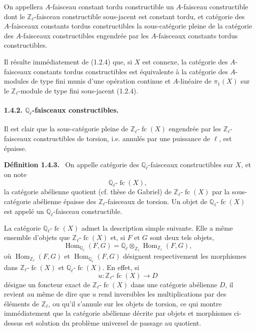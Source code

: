 \documentclass[11pt]{article}
\newenvironment{statement}[1]{\par\medskip\noindent\textbf{#1.}\ }{\par\medskip}
\DeclareMathOperator{\Hom}{Hom}
\providecommand{\Hom}{\operatorname{Hom}}
\providecommand{\fc}{\operatorname{fc}}
\begin{document}
On appellera \(A\)-faisceau constant tordu constructible un \(A\)-faisceau constructible dont le \(\mathbb Z_\ell\)-faisceau constructible sous-jacent est constant tordu, et catégorie des \(A\)-faisceaux constants tordus constructibles la sous-catégorie pleine de la catégorie des \(A\)-faisceaux constructibles engendrée par les \(A\)-faisceaux constants tordus constructibles.

Il résulte immédiatement de (1.2.4) que, si \(X\) est connexe, la catégorie des \(A\)-faisceaux constants tordus constructibles est équivalente à la catégorie des \(A\)-modules de type fini munis d'une opération continue et \(A\)-linéaire de \(\pi_1(X)\) sur le \(\mathbb Z_\ell\)-module de type fini sous-jacent (1.2.4).

\paragraph{1.4.2. \(\mathbb Q_\ell\)-faisceaux constructibles.}
Il est clair que la sous-catégorie pleine de \(\mathbb Z_\ell\text{-}\fc(X)\) engendrée par les \(\mathbb Z_\ell\)-faisceaux constructibles de torsion, i.e. annulés par une puissance de \(\ell\), est épaisse.

\begin{statement}{Définition 1.4.3}
On appelle catégorie des \(\mathbb Q_\ell\)-faisceaux constructibles sur \(X\), et on note
\[
\mathbb Q_\ell\text{-}\fc(X),
\]
la catégorie abélienne quotient (cf. thèse de Gabriel) de \(\mathbb Z_\ell\text{-}\fc(X)\) par la sous-catégorie abélienne épaisse des \(\mathbb Z_\ell\)-faisceaux de torsion. Un objet de \(\mathbb Q_\ell\text{-}\fc(X)\) est appelé un \(\mathbb Q_\ell\)-faisceau constructible.
\end{statement}

La catégorie \(\mathbb Q_\ell\text{-}\fc(X)\) admet la description simple suivante. Elle a même ensemble d'objets que \(\mathbb Z_\ell\text{-}\fc(X)\) et, si \(F\) et \(G\) sont deux tels objets,
\[
\Hom_{\mathbb Q_\ell}(F,G)
=\mathbb Q_\ell\otimes_{\mathbb Z_\ell}\Hom_{\mathbb Z_\ell}(F,G),
\]
où \(\Hom_{\mathbb Z_\ell}(F,G)\) et \(\Hom_{\mathbb Q_\ell}(F,G)\) désignent respectivement les morphismes dans \(\mathbb Z_\ell\text{-}\fc(X)\) et \(\mathbb Q_\ell\text{-}\fc(X)\). En effet, si
\[
u:\mathbb Z_\ell\text{-}\fc(X)\longrightarrow D
\]
désigne un foncteur exact de \(\mathbb Z_\ell\text{-}\fc(X)\) dans une catégorie abélienne \(D\), il revient au même de dire que \(u\) rend inversibles les multiplications par des éléments de \(\mathbb Z_\ell\), ou qu'il s'annule sur les objets de torsion, ce qui montre immédiatement que la catégorie abélienne décrite par objets et morphismes ci-dessus est solution du problème universel de passage au quotient.
\end{document}
